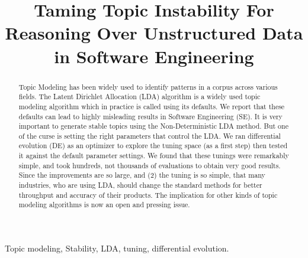 \documentclass[conference]{IEEEtran}
\theoremstyle{break}
\begin{document}
\pagestyle{plain}

\title{\textbf{Taming Topic Instability For Reasoning Over Unstructured Data in Software Engineering}}


\author{

\and
{}
\and
{}

}

\maketitle


\begin{abstract}
Topic Modeling has been widely used to identify patterns in a corpus across various fields. The Latent Dirichlet Allocation (LDA) algorithm is a widely used topic modeling algorithm which in practice is called using its defaults. We report that these defaults can lead to highly misleading results in Software Engineering (SE). It is very important to generate stable topics using the Non-Deterministic LDA method. But one of the curse is setting the right parameters that control the LDA. We ran differential evolution (DE) as an optimizer to explore the tuning space (as a first step) then tested it against the default parameter settings. We found that these tunings were remarkably simple, and took hundreds, not thousands of evaluations to obtain very good results. Since the improvements are so large, and (2) the tuning is so simple, that many industries, who are using LDA, should change the standard methods for better throughput and accuracy of their products. The implication for other kinds of topic modeling algorithms is now an open and pressing issue.
\end{abstract}

\begin{IEEEkeywords}
Topic modeling, Stability, LDA, tuning, differential evolution.
\end{IEEEkeywords}
\end{document}
